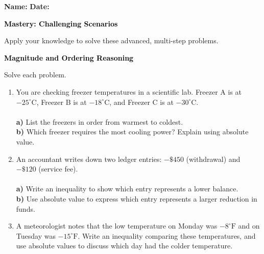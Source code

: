 \documentclass[12pt, letterpaper, fleqn]{article}
\newcommand{\blanklong}{\underline{\hspace{6.5cm}}}
\newcommand{\blankshorter}{\underline{\hspace{1.5cm}}}
\begin{document}
\textbf{Name:} \underline{\hspace{5cm}}
\hfill
\textbf{Date:} \underline{\hspace{3cm}}\\

\begin{tcolorbox}[colback=black!10]
    \large\textcolor{black}{\textbf{Mastery: Challenging Scenarios}}
\end{tcolorbox}

\vspace{3mm}
\noindent
Apply your knowledge to solve these advanced, multi-step problems.

\vspace{4mm}

\begin{tcolorbox}[colback=black!10]
\large\textcolor{black}{\textbf{Magnitude and Ordering Reasoning}}
\end{tcolorbox}

\noindent
Solve each problem.

\vspace{3mm}

\begin{enumerate}[itemsep=1cm, leftmargin=0.6cm]

\item You are checking freezer temperatures in a scientific lab. Freezer A is at $-25^\circ\text{C}$, Freezer B is at $-18^\circ\text{C}$, and Freezer C is at $-30^\circ\text{C}$. \\ \\
\textbf{a)} List the freezers in order from warmest to coldest. \blanklong \\ 
\textbf{b)} Which freezer requires the most cooling power? Explain using absolute value.

\vspace{1.6cm}

\item An accountant writes down two ledger entries: $-\$450$ (withdrawal) and $-\$120$ (service fee). \\  \\
\textbf{a)} Write an inequality to show which entry represents a lower balance. \blankshorter \\
\textbf{b)} Use absolute value to express which entry represents a larger reduction in funds.

\vspace{1.6cm}

\item A meteorologist notes that the low temperature on Monday was $-8^\circ\text{F}$ and on Tuesday was $-15^\circ\text{F}$. Write an inequality comparing these temperatures, and use absolute values to discuss which day had the colder temperature.

\vspace{2cm}

\end{enumerate}
\end{document}
